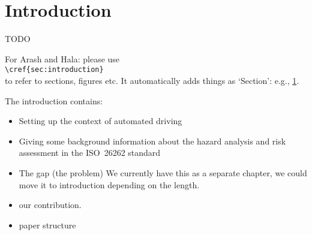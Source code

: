 \section{Introduction}
\label{sec:introduction}

TODO

\color{red}
For Arash and Hala: please use \\{\tt \textbackslash cref\{sec:introduction\}}\\ to refer to sections, figures etc. It automatically adds things as `Section': e.g., \cref{sec:introduction}.
\color{black}

The introduction contains: 
\begin{itemize}
	\item Setting up the context of automated driving
	\item Giving some background information about the hazard analysis and risk assessment in the ISO~26262 standard
	\item The gap (the problem) We currently have this as a separate chapter, we could move it to introduction depending on the length. 
	\item our contribution. 
	\item paper structure
\end{itemize}